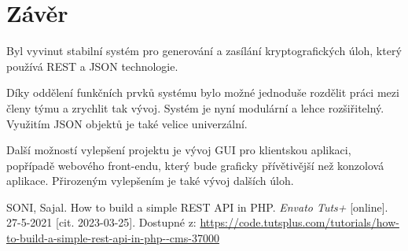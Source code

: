 \documentclass[titlepage]{article}
\begin{document}
\section*{Závěr}
Byl vyvinut stabilní systém pro generování a zasílání kryptografických úloh, který používá REST a JSON technologie. 

Díky oddělení funkčních prvků systému bylo možné jednoduše rozdělit práci mezi členy týmu a zrychlit tak vývoj. Systém je nyní modulární a lehce roz\-šiřitelný. Využitím JSON objektů je také velice univerzální. 

Další možností vylepšení projektu je vývoj GUI pro klientskou aplikaci, popřípadě webového front-endu, který bude graficky přívětivější než konzolová aplikace. Přirozeným vylepšením je také vývoj dalších úloh. 



\begin{thebibliography}{9}
    SONI, Sajal. How to build a simple REST API in PHP. \emph{En\-va\-to Tuts+} [on\-li\-ne]. 27-5-2021 [cit. 2023-03-25]. Dostupné z: \url{https://code.tutsplus.com/tutorials/how-to-build-a-simple-rest-api-in-php--cms-37000}
\end{thebibliography}

    
\end{document}
